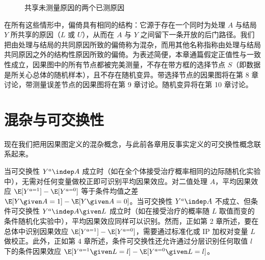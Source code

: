 
\begin{figure}[htbp]
\centering
{}
\caption{共享未测量原因的两个已测原因}
\label{fig:7.3}
\end{figure}

在所有这些情形中，偏倚具有相同的结构：它源于存在一个同时为处理 $A$ 与结局 $Y$ 所共享的原因（$L$ 或 $U$），从而在 $A$ 与 $Y$ 之间留下一条开放的后门路径。我们把由处理与结局的共同原因所致的偏倚称为混杂，而用其他名称指称由处理与结局共同原因之外的结构性原因所致的偏倚。为表述简便，本章通篇假定正值性与一致性成立，因果图中的所有节点都被完美测量，不存在带方框的选择节点 $S$（即数据是所关心总体的随机样本），且不存在随机变异。带选择节点的因果图将在第 8 章讨论，带测量误差节点的因果图将在第 9 章讨论。随机变异将在第 10 章讨论。

\section{混杂与可交换性}

现在我们把用因果图定义的混杂概念，与此前各章用反事实定义的可交换性概念联系起来。

当可交换性 $Y^{a}\indep A$ 成立时（如在全个体接受治疗概率相同的边际随机化实验中），无需对任何变量做校正即可识别平均因果效应。对二值处理 $A$，平均因果效应 $\E[Y^{a=1}]-\E[Y^{a=0}]$ 等于条件均值之差 $\E[Y\given A=1]-\E[Y\given A=0]$。当可交换性 $Y^{a}\indep A$ 不成立、但条件可交换性 $Y^{a}\indep A\given L$ 成立时（如在接受治疗的概率随 $L$ 取值而变的条件随机化实验中），平均因果效应同样可以识别。然而，正如第 2 章所述，要在总体中识别因果效应 $\E[Y^{a=1}]-\E[Y^{a=0}]$，需要通过标准化或 IP 加权对变量 $L$ 做校正。此外，正如第 4 章所述，条件可交换性还允许通过分层识别任何取值 $l$ 下的条件因果效应 $\E[Y^{a=1}\given L=l]-\E[Y^{a=0}\given L=l]$。\mnote{\textcolor{black!85}{关于混杂与可交换性之间关系的详细讨论，见 Greenland and Robins (1986, 2009)。}}

